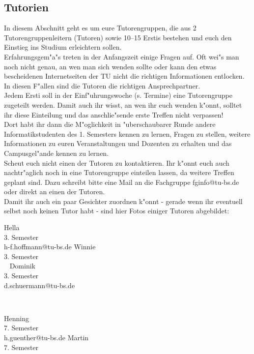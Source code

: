 \subsection{Tutorien}

In diesem Abschnitt geht es um eure Tutorengruppen, die aus 2 Tutorengruppenleitern (Tutoren) sowie 10--15 Erstis bestehen und euch den Einstieg ins Studium erleichtern sollen.\\
Erfahrungsgem"a"s treten in der Anfangszeit einige Fragen auf. Oft wei"s man noch nicht genau, an wen man sich wenden sollte oder kann den etwas bescheidenen Internetseiten der TU nicht die richtigen Informationen entlocken. In diesen F"allen sind die Tutoren die richtigen Ansprechpartner.\\
Jedem Ersti soll in der Einf"uhrungswoche (s. Termine) eine Tutorengruppe zugeteilt werden. Damit auch ihr wisst, an wen ihr euch wenden k"onnt, solltet ihr diese Einteilung und das anschlie"sende erste Treffen nicht verpassen!\\
Dort habt ihr dann die M"oglichkeit in "uberschaubarer Runde andere Informatikstudenten des 1. Semesters kennen zu lernen, Fragen zu stellen, weitere Informationen zu euren Veranstaltungen und Dozenten zu erhalten und das Campusgel"ande kennen zu lernen.\\
Scheut euch nicht einen der Tutoren zu kontaktieren. Ihr k"onnt euch auch nachtr"aglich noch in eine Tutorengruppe einteilen lassen, da weitere Treffen geplant sind. Dazu schreibt bitte eine Mail an die Fachgruppe fginfo@tu-bs.de oder direkt an einen der Tutoren.\\
Damit ihr auch ein paar Gesichter zuordnen k"onnt - gerade wenn ihr eventuell selbst noch keinen Tutor habt - sind hier Fotos einiger Tutoren abgebildet:

\onecolumn


{Hella\\3. Semester\\h-f.hoffmann@tu-bs.de}
\hfill
{}
{Winnie\\3. Semester\\ ~}
\hfill
{}
{Dominik\\3. Semester\\d.schuermann@tu-bs.de}
\par \ \par
{}
{Henning\\7. Semester\\h.guenther@tu-bs.de}
\hfill
{}
{Martin\\7. Semester\\ ~}
\par \ \par

\twocolumn
